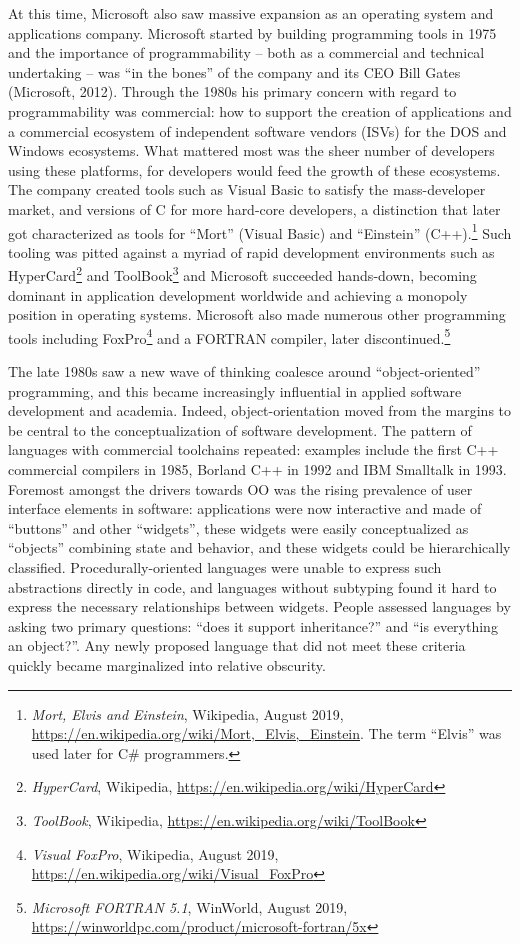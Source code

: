 \documentclass[acmsmall]{acmart}\settopmatter{}
\begin{document}
At this time, Microsoft also saw massive expansion as an operating system and applications company.  Microsoft started by building
programming tools in 1975 and the importance of programmability – both as a commercial and technical undertaking – was “in the bones” of
the company and its CEO Bill Gates (Microsoft, 2012).  Through the 1980s his primary concern with regard to programmability was commercial: how
to support the creation of applications and a commercial ecosystem of independent software vendors (ISVs) for the DOS and
Windows ecosystems.  What mattered most was the sheer number of developers using these platforms, for developers would
feed the growth of these ecosystems.  The company created tools such as Visual Basic to satisfy the mass-developer
market, and versions of C for more hard-core developers, a distinction that later got characterized as
tools for “Mort” (Visual Basic) and “Einstein” (C++).\footnote{ \textit{Mort, Elvis and Einstein}, Wikipedia, August 2019, \url{https://en.wikipedia.org/wiki/Mort,_Elvis,_Einstein}.
The term “Elvis” was used later for C\# programmers.}  Such tooling was pitted against a myriad of rapid development
environments such as HyperCard\footnote{\textit{HyperCard}, Wikipedia, \url{https://en.wikipedia.org/wiki/HyperCard}}  and
ToolBook\footnote{\textit{ToolBook}, Wikipedia, \url{https://en.wikipedia.org/wiki/ToolBook}} and Microsoft succeeded
hands-down, becoming dominant in application development worldwide and achieving a monopoly position in operating
systems.  Microsoft also made numerous other programming tools including FoxPro\footnote{ \textit{Visual FoxPro},
Wikipedia, August 2019, \url{https://en.wikipedia.org/wiki/Visual_FoxPro}} and a FORTRAN compiler, later
discontinued.\footnote{ \textit{Microsoft FORTRAN 5.1}, WinWorld, August 2019, \url{https://winworldpc.com/product/microsoft-fortran/5x}}

The late 1980s saw a new wave of thinking coalesce around “object-oriented” programming, and this became increasingly
influential in applied software development and academia.  Indeed, object-orientation moved from the margins to be central
to the conceptualization of software development.  The pattern of languages with commercial toolchains repeated:
examples include the first C++ commercial compilers in 1985, Borland C++ in 1992 and IBM Smalltalk in 1993.   Foremost
amongst the drivers towards OO was the rising prevalence of user interface elements in software: applications were
now interactive and made of “buttons” and other “widgets”, these widgets were easily conceptualized as “objects” combining
state and behavior, and these widgets could be hierarchically classified. Procedurally-oriented languages were unable
to express such abstractions directly in code, and languages without subtyping found it hard to express the necessary
relationships between widgets. People assessed languages by asking two primary questions: “does it support inheritance?”
and “is everything an object?”.  Any newly proposed language that did not meet these criteria quickly became marginalized into relative obscurity. 
\end{document}
